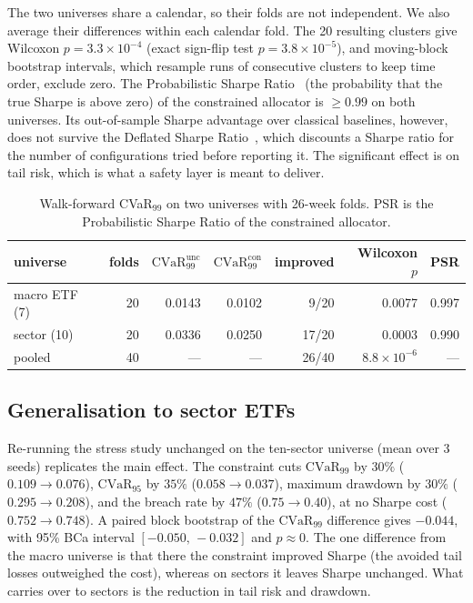 \documentclass[sigconf]{acmart}
\begin{document}
The two universes share a calendar, so their folds are not independent. We also average their differences within each calendar fold. The 20 resulting clusters give Wilcoxon
$p=3.3\times10^{-4}$ (exact sign-flip test $p=3.8\times10^{-5}$), and moving-block bootstrap intervals, which
resample runs of consecutive clusters to keep time order, exclude zero. The Probabilistic Sharpe Ratio~\cite{bailey2012sharpe} (the
probability that the true Sharpe is above zero) of the constrained allocator is $\geq 0.99$ on
both universes. Its out-of-sample Sharpe advantage
over classical baselines, however, does not survive the Deflated Sharpe
Ratio~\cite{bailey2014deflated}, which discounts a Sharpe ratio for the number of configurations
tried before reporting it. The significant effect is on tail risk, which is what a safety layer
is meant to deliver.

\begin{table}[t]
\centering
\caption{Walk-forward CVaR$_{99}$ on two universes with 26-week folds. PSR is the Probabilistic Sharpe Ratio of the constrained allocator.}
\label{tab:stats}
\footnotesize
\setlength{\tabcolsep}{3pt}
\begin{tabular}{@{}lrrrrrr@{}}
\toprule
universe & folds & $\mathrm{CVaR}_{99}^{\text{unc}}$ & $\mathrm{CVaR}_{99}^{\text{con}}$ & improved & Wilcoxon $p$ & PSR \\
\midrule
macro ETF (7)   & 20 & 0.0143 & 0.0102 &  9/20 & 0.0077              & 0.997 \\
sector (10)     & 20 & 0.0336 & 0.0250 & 17/20 & 0.0003              & 0.990 \\
pooled & 40 & --- & --- & 26/40 & $8.8\times10^{-6}$ & --- \\
\bottomrule
\end{tabular}
\end{table}

\subsection{Generalisation to sector ETFs}
\label{sec:generalize}
Re-running the stress study unchanged on the ten-sector universe (mean over 3 seeds)
replicates the main effect. The constraint cuts $\mathrm{CVaR}_{99}$ by $30\%$
($0.109\!\to\!0.076$), $\mathrm{CVaR}_{95}$ by $35\%$ ($0.058\!\to\!0.037$), maximum drawdown by $30\%$
($0.295\!\to\!0.208$), and the breach rate by $47\%$ ($0.75\!\to\!0.40$), at
no Sharpe cost ($0.752\!\to\!0.748$). A paired block bootstrap of the
$\mathrm{CVaR}_{99}$ difference gives $-0.044$, with 95\% BCa interval
$[-0.050,\,-0.032]$ and $p\approx0$. The one difference from the macro universe is that
there the constraint improved Sharpe (the avoided tail losses outweighed the cost),
whereas on sectors it leaves Sharpe unchanged. What carries over to sectors is the reduction
in tail risk and drawdown.
\end{document}
